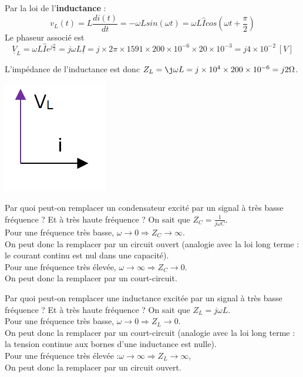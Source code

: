 {Par la loi de l’\textbf{inductance} :
$$v_L(t)=L\frac{di(t)}{dt}=-\omega L sin(\omega t)=\omega L\widehat{I} cos(\omega t+\frac{\pi}{2})$$
Le phaseur associé est 
$$\underline{V}_L=\omega L \widehat{I}e^{j \frac{\pi}{2}}=j\omega L\underline{I}=j\times 2\pi \times 1591 \times 200 \times 10^{-6} \times 20 \times 10^{-3}= j4\times 10^{-2}\ [V]$$

L'impédance de l'inductance est donc $Z_L=\j\omega L=j\times 10^4\times 200 \times 10^{-6}=j2 \Omega$.
\begin{center}
\includegraphics[scale=0.5]{TP1_EXO1b_Q2_1_L.PNG}
\end{center}

}
{
Par quoi peut-on remplacer un condensateur excité par un signal à très basse fréquence ? Et à très haute fréquence ?
}
{
On sait que $Z_C=\frac{1}{j\omega C}$.\\

Pour une fréquence très basse, $\omega \rightarrow 0 \Rightarrow Z_C \rightarrow \infty$.\\
On peut donc la remplacer par un circuit ouvert (analogie avec la loi long terme : le courant continu est nul dans une capacité).\\

Pour une fréquence très élevée, $\omega \rightarrow \infty \Rightarrow Z_C \rightarrow 0$.\\
On peut donc la remplacer par un court-circuit.
}

{
Par quoi peut-on remplacer une inductance excitée par un signal à très basse fréquence ? Et à très haute fréquence ?
}
{
On sait que $Z_L=j\omega L$.\\

Pour une fréquence très basse, $\omega \rightarrow 0 \Rightarrow Z_L \rightarrow 0$.\\
On peut donc la remplacer par un court-circuit (analogie avec la loi long terme : la tension continue aux bornes d’une inductance est nulle).\\

Pour une fréquence très élevée :$\omega \rightarrow \infty \Rightarrow Z_L \rightarrow \infty$,\\
On peut donc la remplacer par un circuit ouvert.
}



